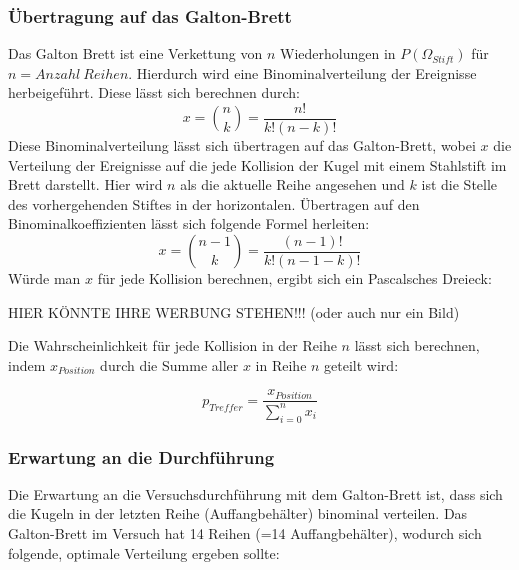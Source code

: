 \subsubsection{Übertragung auf das Galton-Brett}
Das Galton Brett ist eine Verkettung von $n$ Wiederholungen in $P(\Omega_{Stift})$ für $n=Anzahl\ Reihen$. Hierdurch wird eine Binominalverteilung der Ereignisse herbeigeführt. Diese lässt sich berechnen durch:
\begin{equation}
    x=\binom{n}{k}=\frac{n!}{k!(n-k)!}
\end{equation}
Diese Binominalverteilung lässt sich übertragen auf das Galton-Brett, wobei $x$ die Verteilung der Ereignisse auf die jede Kollision der Kugel mit einem Stahlstift im Brett darstellt. Hier wird $n$ als die aktuelle Reihe angesehen und $k$ ist die Stelle des vorhergehenden Stiftes in der horizontalen. Übertragen auf den Binominalkoeffizienten lässt sich folgende Formel herleiten:
\begin{equation}
    x=\binom{n-1}{k}=\frac{(n-1)!}{k!(n-1-k)!}
\end{equation}
Würde man $x$ für jede Kollision berechnen, ergibt sich ein Pascalsches Dreieck:

HIER KÖNNTE IHRE WERBUNG STEHEN!!! (oder auch nur ein Bild)

Die Wahrscheinlichkeit für jede Kollision in der Reihe $n$ lässt sich berechnen, indem $x_{Position}$ durch die Summe aller $x$ in Reihe $n$ geteilt wird:

\begin{equation}
    p_{Treffer}=\frac{x_{Position}}{\sum_{i=0}^n x_i}
\end{equation}

\subsubsection{Erwartung an die Durchführung}
Die Erwartung an die Versuchsdurchführung mit dem Galton-Brett ist, dass sich die Kugeln in der letzten Reihe (Auffangbehälter) binominal verteilen. Das Galton-Brett im Versuch hat 14 Reihen (=14 Auffangbehälter), wodurch sich folgende, optimale Verteilung ergeben sollte:

\begin{table}[thb]
    \centering
    \caption{Erwartungswert am Galton-Brett}
  \end{table}

